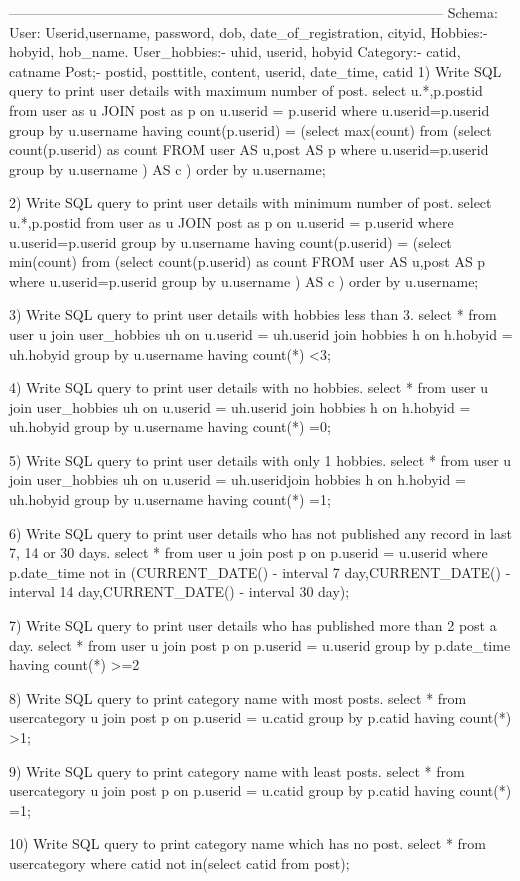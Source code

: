 ---------------------------------------------------------------------------------------------
Schema:
User:
Userid,username, password, dob, date_of_registration, cityid,
Hobbies:- hobyid, hob_name.
User_hobbies:- uhid, userid, hobyid
Category:- catid, catname
Post;- postid, posttitle, content, userid, date_time, catid
1) Write SQL query to print user details with maximum number of post.
	select u.*,p.postid from user as u JOIN post as p  on u.userid = p.userid where u.userid=p.userid 
	group by u.username  having count(p.userid) = (select max(count)   
	from (select count(p.userid) as count FROM user AS u,post AS p   
	where u.userid=p.userid  group by u.username ) AS c ) order by u.username; 

2) Write SQL query to print user details with minimum number of post.
	select u.*,p.postid from user as u JOIN post as p  on u.userid = p.userid where u.userid=p.userid 
	group by u.username  having count(p.userid) = (select min(count)   
	from (select count(p.userid) as count FROM user AS u,post AS p   
	where u.userid=p.userid  group by u.username ) AS c ) order by u.username; 

3) Write SQL query to print user details with hobbies less than 3.
select * from user u join user_hobbies uh on u.userid = uh.userid join hobbies h on h.hobyid = uh.hobyid group by u.username having count(*) <3;

4) Write SQL query to print user details with no hobbies.
 select * from user u join user_hobbies uh on u.userid = uh.userid join hobbies h on h.hobyid = uh.hobyid group by u.username having count(*) =0;

5) Write SQL query to print user details with only 1 hobbies.
select * from user u join user_hobbies uh on u.userid = uh.useridjoin hobbies h on h.hobyid = uh.hobyid group by u.username having count(*) =1;

6) Write SQL query to print user details who has not published any record in last 7, 14 or
30 days.
select * from user u join post p on p.userid = u.userid where p.date_time not in (CURRENT_DATE() - interval 7 day,CURRENT_DATE() - interval 14 day,CURRENT_DATE() - interval 30 day);

7) Write SQL query to print user details who has published more than 2 post a day.
select * from user u join post p on p.userid = u.userid group by p.date_time having count(*) >=2

8) Write SQL query to print category name with most posts.
	select * from usercategory u join post p on p.userid = u.catid group by p.catid having count(*) >1;


9) Write SQL query to print category name with least posts.
	select * from usercategory u join post p on p.userid = u.catid group by p.catid having count(*) =1;

10) Write SQL query to print category name which has no post.
	select * from usercategory where catid not in(select catid from post);


